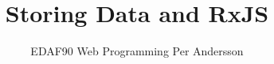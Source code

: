 \documentclass[aspectratio=1610]{beamer}
\title[Storing Data and RxJS]{Storing Data and RxJS}
\author[EDAF90]{%
  EDAF90 Web Programming\newline
  Per Andersson}
\begin{document}
\begin{frame}[plain]%
  \titlepage
\end{frame}


%


%


\end{document}
